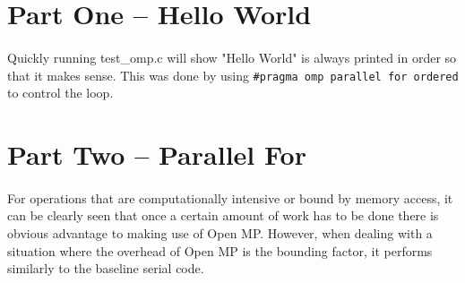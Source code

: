 \documentclass[10pt,8.5in,11in]{article}
\begin{document}
	\maketitle
	
\section{Part One -- Hello World}

\paragraph{}
Quickly running test\_omp.c will show "Hello World" is always printed in order so that it makes sense.  This was done by using \texttt{\#pragma omp parallel for ordered} to control the loop.

\section{Part Two -- Parallel For}

\paragraph{}
For operations that are computationally intensive or bound by memory access, it can be clearly seen that once a certain amount of work has to be done there is obvious advantage to making use of Open MP.  However, when dealing with a situation where the overhead of Open MP is the bounding factor, it performs similarly to the baseline serial code.
\end{document}
